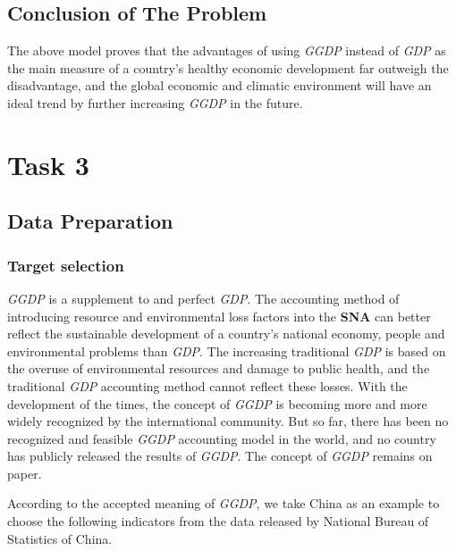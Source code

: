 \documentclass[12pt]{article}
\begin{document}
	\subsection{Conclusion of The Problem} %
	The above model proves that the advantages of using \textit{GGDP} instead of \textit{GDP} as the main measure of a country's healthy economic development far outweigh the disadvantage, and the global economic and climatic environment will have an ideal trend by further increasing \textit{GGDP} in the future.
	
	\section{Task 3}\label{task3} %
	\subsection{Data Preparation} %
	\subsubsection{Target selection}\label{IndexSelection} %
	\textit{GGDP} is a supplement to and perfect \textit{GDP}.
	The accounting method of introducing resource and environmental loss factors into the \textbf{SNA} can better reflect the sustainable development of a country's national economy, people and environmental problems than \textit{GDP}.
	The increasing traditional \textit{GDP} is based on the overuse of environmental resources and damage to public health, and the traditional \textit{GDP} accounting method cannot reflect these losses.
	With the development of the times, the concept of \textit{GGDP} is becoming more and more widely recognized by the international community.
	But so far, there has been no recognized and feasible \textit{GGDP} accounting model in the world, and no country has publicly released the results of \textit{GGDP}.
	The concept of \textit{GGDP} remains on paper.
	
	According to the accepted meaning of \textit{GGDP}, we take China as an example to choose the following indicators from the data released by National Bureau of Statistics of China\cite{6}.
	
\end{document}
